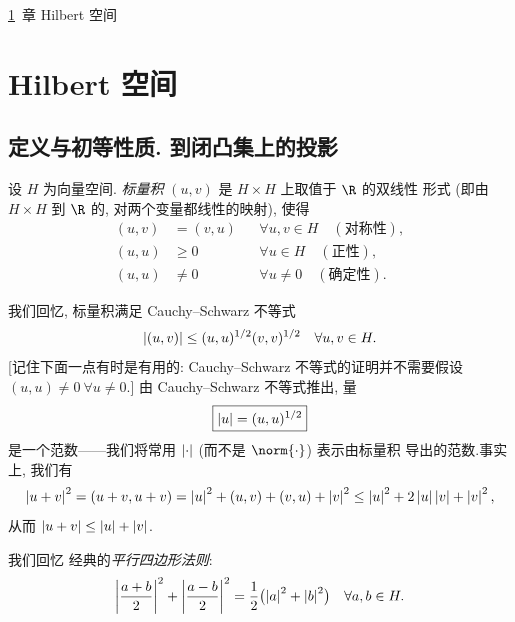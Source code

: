 \ref{chap:5}~章 
Hilbert 空间

\chapter{Hilbert 空间}
\label{chap:5}

\section{定义与初等性质. 
到闭凸集上的投影}
\label{sec:5.1}

\begin{definition}
设 $H$ 为向量空间.
\emph{标量积} $(u,v)$ 是 $H\times H$ 上取值于 $\R$ 的双线性
形式 (即由 $H\times H$ 到 $\R$ 的, 对两个变量都线性的映射), 使得
\begin{align*}
(u,v)&=(v,u) &&\forall u,v\in H\quad(\text{对称性}),\\
(u,u)&\ge0 &&\forall u\in H\quad(\text{正性}),\\
(u,u)&\ne0 &&\forall u\ne0\quad(\text{确定性}).
\end{align*}
\end{definition}

我们回忆, 标量积满足 Cauchy--Schwarz 不等式
\begin{equation*}
\left|(u,v)\right|\le(u,u)^{1/2}(v,v)^{1/2}\quad\forall u,v\in H.
\end{equation*}
[记住下面一点有时是有用的: Cauchy--Schwarz 不等式的证明并不需要假设
$(u,u)\ne0\ \forall u\ne0$.] 由 Cauchy--Schwarz 不等式推出, 量
\begin{equation*}
\boxed{\left|u\right|=(u,u)^{1/2}}
\end{equation*}
是一个范数——我们将常用 $\left|\cdot\right|$ (而不是 $\norm{\cdot}$) 表示由标量积
导出的范数.事实上, 我们有
\begin{equation*}
\left|u+v\right|^2=(u+v,u+v)=\left|u\right|^2+(u,v)+(v,u)+\left|v\right|^2
\le\left|u\right|^2+2\left|u\right|\left|v\right|+\left|v\right|^2,
\end{equation*}
从而 $\left|u+v\right|\le\left|u\right|+\left|v\right|$.

我们回忆
经典的\emph{平行四边形法则}:
\begin{equation}
\left|\frac{a+b}{2}\right|^2+\left|\frac{a-b}{2}\right|^2
=\frac12\bigl(\left|a\right|^2+\left|b\right|^2\bigr)\quad\forall a,b\in H.
\label{eq:5.1}
\end{equation}

